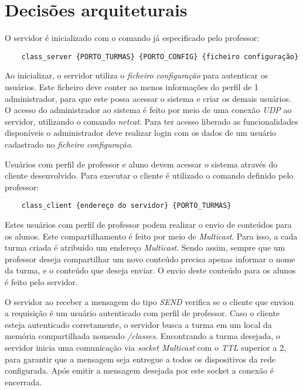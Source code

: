 \documentclass[a4paper]{article}
\begin{document}
\section{Decisões arquiteturais}

O servidor é inicializado com o comando já especificado pelo professor: 

\begin{verbatim}
    class_server {PORTO_TURMAS} {PORTO_CONFIG} {ficheiro configuração}
\end{verbatim}

Ao inicializar, o servidor utiliza o \textit{ficheiro configuração} para autenticar os usuários. Este ficheiro deve conter ao menos informações do perfil de 1 administrador, para que este possa acessar o sistema e criar os demais usuários. O acesso do administrador ao sistema é feito por meio de uma conexão  \textit{UDP} ao servidor, utilizando o comando \textit{netcat}. Para ter acesso liberado as funcionalidades disponíveis o administrador deve realizar login com os dados de um usuário cadastrado no \textit{ficheiro configuração}.

Usuários com perfil de professor e aluno devem acessar o sistema através do cliente desenvolvido. Para executar o cliente é utilizado o comando definido pelo professor:

\begin{verbatim}
    class_client {endereço do servidor} {PORTO_TURMAS}
\end{verbatim}

Estes usuários com perfil de professor podem realizar o envio de conteúdos para os alunos. Este compartilhamento é feito por meio de \textit{Multicast}. Para isso, a cada turma criada é atribuído um endereço \textit{Multicast}. Sendo assim, sempre que um professor deseja compartilhar um novo conteúdo precisa apenas informar o nome da turma, e o conteúdo que deseja enviar. O envio deste conteúdo para os alunos é feito pelo servidor.

O servidor ao receber a mensagem do tipo \textit{SEND} verifica se o cliente que enviou a requisição é um usuário autenticado com perfil de professor. Caso o cliente esteja autenticado corretamente, o servidor busca a turma em um local da memória compartilhada nomeado \textit{/classes}. Encontrando a turma desejada, o servidor inicia uma comunicação via \textit{socket Multicast} com o \textit{TTL} superior a 2, para garantir que a mensagem seja entregue a todos os dispositivos da rede configurada. Após emitir a mensagem desejada por este socket a conexão é encerrada.
\end{document}
